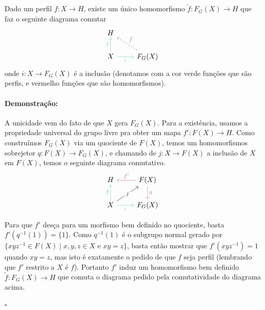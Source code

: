 \documentclass[11pt]{article}
\newcommand{\pulinho}{\vspace{.5cm}}
\theoremstyle{definition}
\theoremstyle{definition}
\theoremstyle{definition}
\theoremstyle{definition}
\newtheorem*{prop*}{Proposição}
\newenvironment{proposicao*}{
\definecolor{shadecolor}{HTML}{FFDBDF}
\begin{shaded}
\begin{prop*}
}
{
\end{prop*}
\end{shaded}
}
\theoremstyle{definition}
\theoremstyle{definition}
\theoremstyle{definition}
\theoremstyle{definition}
\theoremstyle{definition}
\theoremstyle{definition}
\theoremstyle{definition}
\theoremstyle{definition}
\newenvironment{prova}{\paragraph{Demonstração:}}{\hfill$\square$ 
\pulinho
}
\theoremstyle{definition}
\begin{document}
\begin{proposicao*}
  Dado um perfil $f: X \rightarrow H$, existe um único homomorfismo $\tilde{f}: F_G(X) \rightarrow H$ que faz o seguinte diagrama comutar 
\[\begin{tikzcd}
	H & \\
	X & {F_G(X)}
	\arrow["f", color={rgb,255:red,90;green,216;blue,155}, from=2-1, to=1-1]
	\arrow["i"', color={rgb,255:red,90;green,216;blue,155}, from=2-1, to=2-2]
	\arrow["{\tilde{f}}"', color={rgb,255:red,198;green,108;blue,123}, dashed, from=2-2, to=1-1]
\end{tikzcd}\]
onde $i: X \rightarrow F_G(X)$ é a inclusão (denotamos com a cor verde funções que são perfis, e vermelho funções que são homomorfismos).
\end{proposicao*}
\begin{prova}
  A unicidade vem do fato de que $X$ gera $F_G(X)$. Para a existência, usamos a propriedade universal do grupo livre pra obter um mapa $f': F(X) \rightarrow H$. Como construímos $F_G(X)$ via um quociente de $F(X)$, temos um homomorfismos sobrejetor $q: F(X) \rightarrow F_G(X)$, e chamando de $j: X \rightarrow F(X)$ a inclusão de $X$ em $F(X)$, temos o seguinte diagrama comutativo.
\[\begin{tikzcd}
	H & {F(X)} \\
	X & {F_G(X)}
	\arrow["{f'}"', color={rgb,255:red,198;green,108;blue,123}, from=1-2, to=1-1]
	\arrow["q", color={rgb,255:red,198;green,108;blue,123}, from=1-2, to=2-2]
	\arrow["f", color={rgb,255:red,90;green,216;blue,155}, from=2-1, to=1-1]
	\arrow["j"{description}, from=2-1, to=1-2]
	\arrow["i"', color={rgb,255:red,90;green,216;blue,155}, from=2-1, to=2-2]
\end{tikzcd}\]

Para que $f'$ desça para um morfismo bem definido no quociente, basta $f'(q^{-1}(1)) = \{1\}$. Como $q^{-1}(1)$ é o subgrupo normal gerado por $\{xyz^{-1} \in F(X) \mid x,y,z \in X \text{ e } xy = z\}$, basta então mostrar que $f'(xyz^{-1}) = 1$ quando $xy = z$, mas isto é exatamente o pedido de que $f$ seja perfil (lembrando que $f'$ restrito a $X$ é $f$). Portanto $f'$ induz um homomorfismo bem definido $\tilde{f}: F_G(X) \rightarrow H$ que comuta o diagrama pedido pela comutatividade do diagrama acima.

\end{prova}
\end{document}
